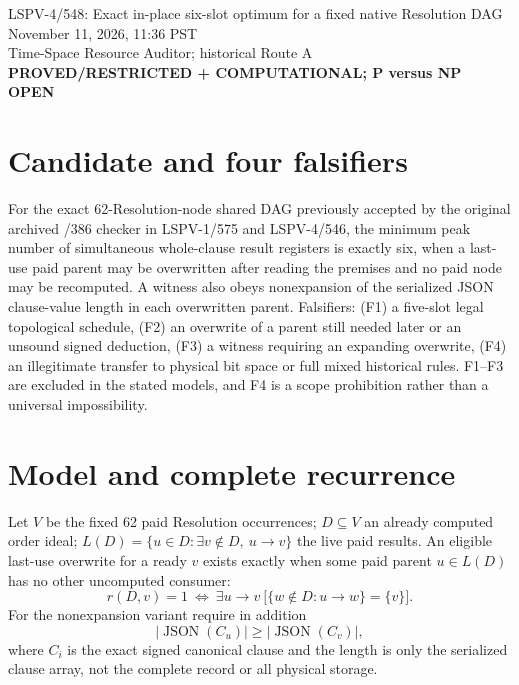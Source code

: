 \documentclass[11pt]{article}
\begin{document}
\begin{center}
{\Large LSPV-4/548: Exact in-place six-slot optimum for a fixed native Resolution DAG}\\
November 11, 2026, 11:36 PST\\
Time-Space Resource Auditor; historical Route A\\
\textbf{PROVED/RESTRICTED + COMPUTATIONAL; P versus NP OPEN}
\end{center}

\section*{Candidate and four falsifiers}
For the exact 62-Resolution-node shared DAG previously accepted by the original archived /386 checker in LSPV-1/575 and LSPV-4/546, the minimum peak number of simultaneous whole-clause result registers is exactly six, when a last-use paid parent may be overwritten after reading the premises and no paid node may be recomputed. A witness also obeys nonexpansion of the serialized JSON clause-value length in each overwritten parent. Falsifiers: (F1) a five-slot legal topological schedule, (F2) an overwrite of a parent still needed later or an unsound signed deduction, (F3) a witness requiring an expanding overwrite, (F4) an illegitimate transfer to physical bit space or full mixed historical rules. F1--F3 are excluded in the stated models, and F4 is a scope prohibition rather than a universal impossibility.

\section*{Model and complete recurrence}
Let \(V\) be the fixed 62 paid Resolution occurrences; \(D\subseteq V\) an already computed order ideal; \(L(D)=\{u\in D:\exists v\notin D,\ u\to v\}\) the live paid results. An eligible last-use overwrite for a ready \(v\) exists exactly when some paid parent \(u\in L(D)\) has no other uncomputed consumer:
\[
r(D,v)=1 \ \Longleftrightarrow\
\exists u\to v\ \bigl[\{w\notin D:u\to w\}=\{v\}\bigr].
\]
For the nonexpansion variant require in addition
\[
|\operatorname{JSON}(C_u)|\geq|\operatorname{JSON}(C_v)|,
\]
where \(C_i\) is the exact signed canonical clause and the length is only the serialized clause array, not the complete record or all physical storage.
\end{document}
